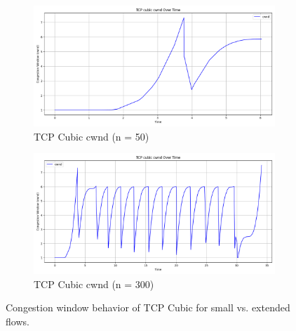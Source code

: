 \documentclass[conference]{IEEEtran}
\begin{document}
\begin{figure}[h!]
    \centering
    \begin{subfigure}[t]{0.48\textwidth}
        \centering
        \includegraphics[width=\linewidth]{assets/n50_cubic_cwnd_over_time.png}
        \caption{TCP Cubic cwnd (n = 50)}
        \label{fig:cubic_n50}
    \end{subfigure}
    \hfill
    \begin{subfigure}[t]{0.48\textwidth}
        \centering
        \includegraphics[width=\linewidth]{assets/n300_cubic_cwnd_over_time.png}
        \caption{TCP Cubic cwnd (n = 300)}
        \label{fig:cubic_n300}
    \end{subfigure}
    \caption{Congestion window behavior of TCP Cubic for small vs. extended flows.}
    \label{fig:n_cubic_cwnd}
\end{figure}
\end{document}
